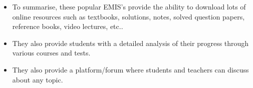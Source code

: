 \documentclass{beamer}
\begin{document}
\begin{frame}

\begin{itemize}

\item To summarise, these popular EMIS's provide the ability to download lots of online resources such as textbooks, solutions, notes, solved question papers, reference books, video lectures, etc..

\item They also provide students with a detailed analysis of their progress through various courses and tests.

\item They also provide a platform/forum where students and teachers can discuss about any topic.

\end{itemize}

\end{frame}
\end{document}
